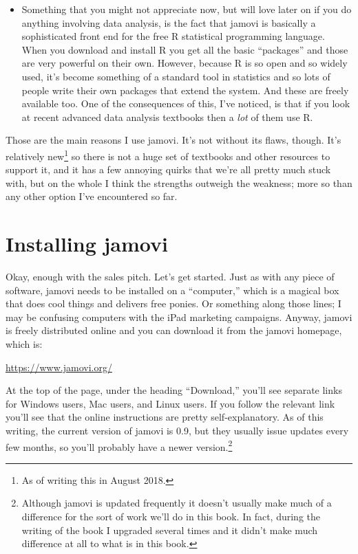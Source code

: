 \documentclass[
]{book}
\begin{document}
\begin{itemize}
\item
  Something that you might not appreciate now, but will love later on if you do anything involving data analysis, is the fact that jamovi is basically a sophisticated front end for the free R statistical programming language. When you download and install R you get all the basic ``packages'' and those are very powerful on their own. However, because R is so open and so widely used, it's become something of a standard tool in statistics and so lots of people write their own packages that extend the system. And these are freely available too. One of the consequences of this, I've noticed, is that if you look at recent advanced data analysis textbooks then a \emph{lot} of them use R.
\end{itemize}

Those are the main reasons I use jamovi. It's not without its flaws, though. It's relatively new\footnote{As of writing this in August 2018.} so there is not a huge set of textbooks and other resources to support it, and it has a few annoying quirks that we're all pretty much stuck with, but on the whole I think the strengths outweigh the weakness; more so than any other option I've encountered so far.

\hypertarget{gettingjamovi}{%
\section{Installing jamovi}\label{gettingjamovi}}

Okay, enough with the sales pitch. Let's get started. Just as with any piece of software, jamovi needs to be installed on a ``computer,'' which is a magical box that does cool things and delivers free ponies. Or something along those lines; I may be confusing computers with the iPad marketing campaigns. Anyway, jamovi is freely distributed online and you can download it from the jamovi homepage, which is:

\url{https://www.jamovi.org/}

At the top of the page, under the heading ``Download,'' you'll see separate links for Windows users, Mac users, and Linux users. If you follow the relevant link you'll see that the online instructions are pretty self-explanatory. As of this writing, the current version of jamovi is 0.9, but they usually issue updates every few months, so you'll probably have a newer version.\footnote{Although jamovi is updated frequently it doesn't usually make much of a difference for the sort of work we'll do in this book. In fact, during the writing of the book I upgraded several times and it didn't make much difference at all to what is in this book.}
\end{document}
